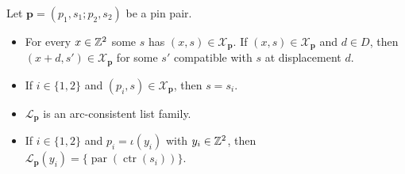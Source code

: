 \begin{lemma}\label{thr:lists}
Let $\mathbf p=(p_1,s_1;p_2,s_2)$ be a pin pair.
\begin{itemize}
\item[(a)] For every $x\in\mathbb{Z}^2$ some $s$ has $(x,s)\in\mathcal X_{\mathbf p}$. If $(x,s)\in\mathcal X_{\mathbf p}$ and $d\in D$, then $(x+d,s')\in\mathcal X_{\mathbf p}$ for some $s'$ compatible with $s$ at displacement $d$.
\item[(b)] If $i\in\{1,2\}$ and $(p_i,s)\in\mathcal X_{\mathbf p}$, then $s=s_i$.
\item[(c)] $\mathcal L_{\mathbf p}$ is an arc-consistent list family.
\item[(d)] If $i\in\{1,2\}$ and $p_i=\iota(y_i)$ with $y_i\in\mathbb{Z}^2$, then $\mathcal L_{\mathbf p}(y_i)=\{\operatorname{par}(\operatorname{ctr}(s_i))\}$.
\end{itemize}
\end{lemma}

